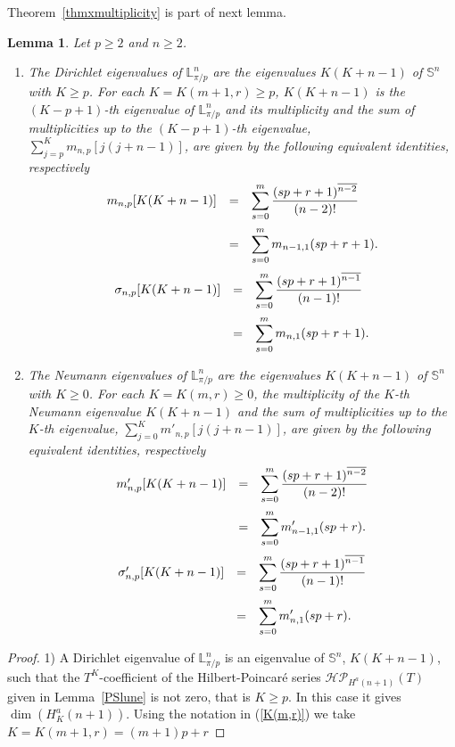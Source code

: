 \documentclass[11pt,a4paper,times]{amsart}
\theoremstyle{plain}
\newtheorem{lemma}[thm]{Lemma}
\theoremstyle{definition}
\numberwithin{equation}{section}
\newcommand{\ds}{\displaystyle}
\newcommand{\dsum}{\ds\sum}
\newcommand{\eqskip}{ \vspace*{2mm}\\ }
\newcommand{\lune}[2]{\mathbb{L}^{#1}_{#2}}
\newcommand{\txtg}{\textcolor{green}}
\begin{document}
{ Theorem~\ref{thmxmultiplicity} is part of next lemma. 
\begin{lemma}\label{lemmaA}
Let $p\geq 2$ and $n\geq 2$.
\begin{enumerate}[{\rm 1)}]
\item The  Dirichlet eigenvalues of $\lune{n}{\pi/p}$ are the eigenvalues $K(K+n-1)$ of $\mathbb{S}^n$
with $K\geq p$. For each $K=K(m+1,r)\geq p$, $K(K+n-1)$ is the
 $(K-p+1)$-th eigenvalue of $\lune{n}{\pi/p}$
 and its multiplicity and
the  sum of multiplicities up to the $(K-p+1)$-th  eigenvalue,  $\dsum_{j=p}^{K}m_{n,p}[j(j+n-1)]$,
are  given by the following equivalent identities, respectively
\[
\begin{array}{lll}
m_{n,p}[K(K+n-1)] & = &
 \dsum_{s=0}^m\frac{(sp+r+1)^{\overline{n-2}}}{(n-2)!}\eqskip
& = & \dsum_{s=0}^mm_{n-1,1}(sp+r+1).
\end{array}
\]
\[
\begin{array}{lll}
\sigma_{n,p}[K(K+n-1)]
 & = & \dsum_{s=0}^m\frac{(sp+r+1)^{\overline{n-1}}}{(n-1)!}\eqskip
 & = & \dsum_{s=0}^m m_{n,1}(sp+r+1).
\end{array}
\]
%
\noindent
\item The  Neumann eigenvalues  of $\lune{n}{\pi/p}$ are the  eigenvalues  $K(K+n-1)$ of $\mathbb{S}^n$ with $K\geq 0$.
For each $K=K(m,r)\geq 0$, the multiplicity of the $K$-th  Neumann eigenvalue $K(K+n-1)$ and the sum of multiplicities up to the $K$-th eigenvalue, $\sum_{j=0}^K m'_{n,p}[j(j+n-1)]$, are given by the following equivalent identities, respectively
%
\[
\begin{array}{lll}
m'_{n,p}[K(K+n-1)] & = &\dsum_{s=0}^{m}\frac{(sp+r+1)^{\overline{n-2}}}{(n-2)!}\eqskip
& = & \dsum_{s=0}^{m}m'_{n-1,1}(sp+r).
\end{array}
\]
\[
\begin{array}{lll}
\sigma'_{n,p}[K(K+n-1)] & = &  \dsum_{s=0}^m\frac{(sp+r+1)^{\overline{n-1}}}{(n-1)!}\eqskip
& = & \dsum_{s=0}^m m'_{n,1}(sp+r).
\end{array}
\]
\end{enumerate}
\end{lemma}
%
\begin{proof}
 1)
A Dirichlet eigenvalue of $\lune{n}{\pi/p}$  is an eigenvalue of $\mathbb{S}^n$, 
$K(K+n-1)$,  such that the  $T^K$-coefficient of the Hilbert-Poincar\'{e} series $\mathcal{HP}_{H^a(n+1)}(T)$ given in Lemma~\ref{PSlune} is not zero,  that is $K\geq p$.   In this case it  gives $\dim(H^a_K(n+1))$.
Using the notation in (\ref{K(m,r)}) we  take $K=K(m+1,r)=(m+1)p+r$

\end{proof}}
\end{document}
